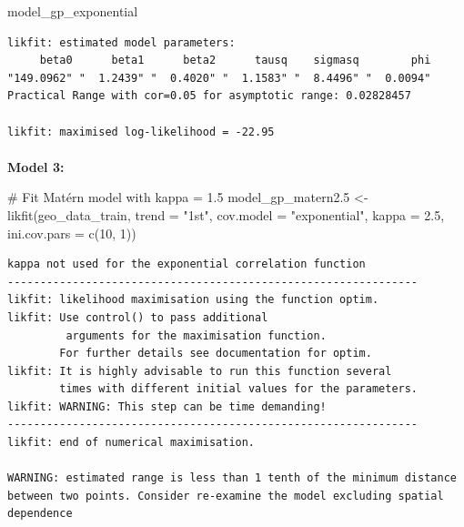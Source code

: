 \documentclass[
  11pt,
]{article}
\makeatletter
\let\oldparagraph\paragraph
\renewcommand{\paragraph}{
    \@ifstar
      \xxxParagraphStar
      \xxxParagraphNoStar
  }
\newcommand{\xxxParagraphStar}[1]{\oldparagraph*{#1}\mbox{}}
\newcommand{\xxxParagraphNoStar}[1]{\oldparagraph{#1}\mbox{}}
\newenvironment{Shaded}{\begin{snugshade}}{\end{snugshade}}
\newcommand{\AttributeTok}[1]{\textcolor[rgb]{0.40,0.45,0.13}{#1}}
\newcommand{\CommentTok}[1]{\textcolor[rgb]{0.37,0.37,0.37}{#1}}
\newcommand{\DecValTok}[1]{\textcolor[rgb]{0.68,0.00,0.00}{#1}}
\newcommand{\FloatTok}[1]{\textcolor[rgb]{0.68,0.00,0.00}{#1}}
\newcommand{\FunctionTok}[1]{\textcolor[rgb]{0.28,0.35,0.67}{#1}}
\newcommand{\NormalTok}[1]{\textcolor[rgb]{0.00,0.23,0.31}{#1}}
\newcommand{\OtherTok}[1]{\textcolor[rgb]{0.00,0.23,0.31}{#1}}
\newcommand{\StringTok}[1]{\textcolor[rgb]{0.13,0.47,0.30}{#1}}
\makeatother
\begin{document}
\begin{Shaded}
\begin{Highlighting}[]
\NormalTok{model\_gp\_exponential}
\end{Highlighting}
\end{Shaded}

\begin{verbatim}
likfit: estimated model parameters:
     beta0      beta1      beta2      tausq    sigmasq        phi 
"149.0962" "  1.2439" "  0.4020" "  1.1583" "  8.4496" "  0.0094" 
Practical Range with cor=0.05 for asymptotic range: 0.02828457

likfit: maximised log-likelihood = -22.95
\end{verbatim}

\paragraph{\texorpdfstring{\textbf{Model 3:}}{Model 3:}}\label{model-3}

\begin{Shaded}
\begin{Highlighting}[]
\CommentTok{\# Fit Matérn model with kappa = 1.5}
\NormalTok{model\_gp\_matern2}\FloatTok{.5} \OtherTok{\textless{}{-}} \FunctionTok{likfit}\NormalTok{(geo\_data\_train, }\AttributeTok{trend =} \StringTok{"1st"}\NormalTok{, }\AttributeTok{cov.model =} \StringTok{"exponential"}\NormalTok{, }\AttributeTok{kappa =} \FloatTok{2.5}\NormalTok{, }\AttributeTok{ini.cov.pars =} \FunctionTok{c}\NormalTok{(}\DecValTok{10}\NormalTok{, }\DecValTok{1}\NormalTok{))}
\end{Highlighting}
\end{Shaded}

\begin{verbatim}
kappa not used for the exponential correlation function
---------------------------------------------------------------
likfit: likelihood maximisation using the function optim.
likfit: Use control() to pass additional
         arguments for the maximisation function.
        For further details see documentation for optim.
likfit: It is highly advisable to run this function several
        times with different initial values for the parameters.
likfit: WARNING: This step can be time demanding!
---------------------------------------------------------------
likfit: end of numerical maximisation.

WARNING: estimated range is less than 1 tenth of the minimum distance between two points. Consider re-examine the model excluding spatial dependence
\end{verbatim}
\end{document}
